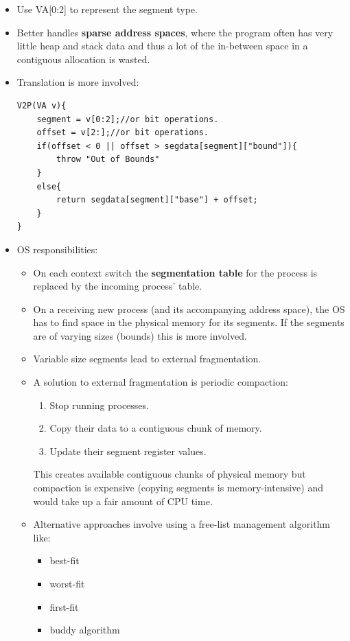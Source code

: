 \documentclass[10pt]{report}
\begin{document}
\begin{itemize}
\item Use VA[0:2] to represent the segment type.
\item Better handles \textbf{sparse address spaces}, where
the program often has very little heap and stack data and
thus a lot of the in-between space in a contiguous allocation is 
wasted.
\item Translation is more involved:
\begin{lstlisting}
V2P(VA v){
    segment = v[0:2];//or bit operations.
    offset = v[2:];//or bit operations.
    if(offset < 0 || offset > segdata[segment]["bound"]){
        throw "Out of Bounds"
    }
    else{
        return segdata[segment]["base"] + offset;
    }
}
\end{lstlisting}
\item OS responsibilities:
\begin{itemize}
    \item On each context switch the \textbf{segmentation table} for the process is replaced by the incoming process' table.
    \item On a receiving new process (and its accompanying address 
    space), the OS has to find space in the physical memory for its 
    segments. If the segments are of varying sizes (bounds) this is more involved.
    \item Variable size segments lead to external fragmentation.
    \item A solution to external fragmentation is periodic compaction:
    \begin{enumerate}
        \item Stop running processes.
        \item Copy their data to a contiguous chunk of memory.
        \item Update their segment register values.
    \end{enumerate}
    This creates available contiguous chunks of physical memory but 
    compaction is expensive (copying segments is memory-intensive)
    and would take up a fair amount of CPU time.
    \item Alternative approaches involve using a free-list 
    management algorithm like:
    \begin{itemize}
        \item best-fit
        \item worst-fit
        \item first-fit
        \item buddy algorithm
    \end{itemize} 

\end{itemize}
\end{itemize}
\end{document}
